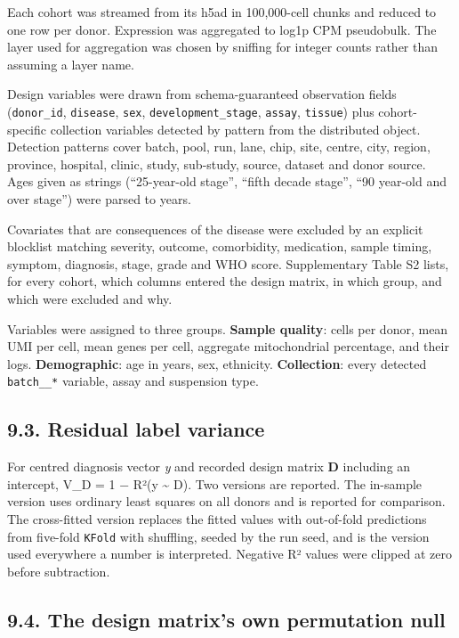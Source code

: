 Each cohort was streamed from its h5ad in 100,000-cell chunks and reduced to one row per donor. Expression was aggregated to log1p CPM pseudobulk. The layer used for aggregation was chosen by sniffing for integer counts rather than assuming a layer name.

Design variables were drawn from schema-guaranteed observation fields (\texttt{donor\_id}, \texttt{disease}, \texttt{sex}, \texttt{development\_stage}, \texttt{assay}, \texttt{tissue}) plus cohort-specific collection variables detected by pattern from the distributed object. Detection patterns cover batch, pool, run, lane, chip, site, centre, city, region, province, hospital, clinic, study, sub-study, source, dataset and donor source. Ages given as strings (``25-year-old stage'', ``fifth decade stage'', ``90 year-old and over stage'') were parsed to years.

Covariates that are consequences of the disease were excluded by an explicit blocklist matching severity, outcome, comorbidity, medication, sample timing, symptom, diagnosis, stage, grade and WHO score. Supplementary Table S2 lists, for every cohort, which columns entered the design matrix, in which group, and which were excluded and why.

Variables were assigned to three groups. \textbf{Sample quality}: cells per donor, mean UMI per cell, mean genes per cell, aggregate mitochondrial percentage, and their logs. \textbf{Demographic}: age in years, sex, ethnicity. \textbf{Collection}: every detected \texttt{batch\_\_*} variable, assay and suspension type.

\subsection{9.3. Residual label variance}\label{residual-label-variance-1}

For centred diagnosis vector \emph{y} and recorded design matrix \textbf{D} including an intercept, V\_D = 1 − R²(y \textasciitilde{} D). Two versions are reported. The in-sample version uses ordinary least squares on all donors and is reported for comparison. The cross-fitted version replaces the fitted values with out-of-fold predictions from five-fold \texttt{KFold} with shuffling, seeded by the run seed, and is the version used everywhere a number is interpreted. Negative R² values were clipped at zero before subtraction.

\subsection{9.4. The design matrix's own permutation null}\label{the-design-matrixs-own-permutation-null}

